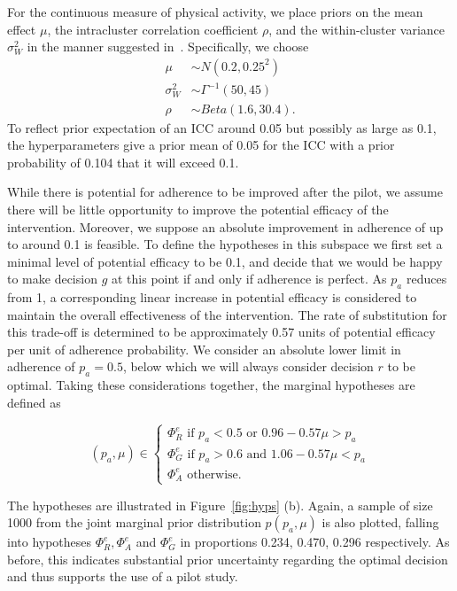 \documentclass[AMA,STIX1COL]{WileyNJD-v2}
\begin{document}
For the continuous measure of physical activity, we  place priors on the mean effect $\mu$, the intracluster correlation coefficient $\rho$, and the within-cluster variance $\sigma_{W}^{2}$ in the manner suggested in~\cite{Spiegelhalter2001}. Specifically, we choose
\begin{align}
\mu & \sim N(0.2, 0.25^{2}) \\
\sigma_{W}^{2} & \sim \Gamma^{-1}(50, 45) \\
\rho & \sim Beta(1.6, 30.4).
\end{align}
To reflect prior expectation of an ICC around 0.05 but possibly as large as 0.1, the hyperparameters give a prior mean of 0.05 for the ICC with a prior probability of 0.104 that it will exceed 0.1. 

While there is potential for adherence to be improved after the pilot, we assume there will be little opportunity to improve the potential efficacy of the intervention. Moreover, we suppose an absolute improvement in adherence of up to around 0.1 is feasible. To define the hypotheses in this subspace we first set a minimal level of potential efficacy to be 0.1, and decide that we would be happy to make decision $g$ at this point if and only if adherence is perfect. As $p_{a}$ reduces from 1, a corresponding linear increase in potential efficacy is considered to maintain the overall effectiveness of the intervention. The rate of substitution for this trade-off is determined to be approximately 0.57 units of potential efficacy per unit of adherence probability. We consider an absolute lower limit in adherence of $p_{a} = 0.5$, below which we will always consider decision $r$ to be optimal. Taking these considerations together, the marginal hypotheses are defined as

\begin{equation}
  (p_{a}, \mu) \in \begin{cases}
               \Phi^e_R \text{ if } p_{a} < 0.5 \text{ or } 0.96-0.57\mu > p_{a} \\
               \Phi^e_G \text{ if } p_{a} > 0.6 \text{ and } 1.06-0.57\mu < p_{a} \\
               \Phi^e_A \text{ otherwise.}
            \end{cases}
\end{equation}

The hypotheses are illustrated in Figure~\ref{fig:hyps} (b). Again, a sample of size 1000 from the joint marginal prior distribution $p(p_{a}, \mu)$ is also plotted, falling into hypotheses $\Phi^e_R, \Phi^e_A$ and $\Phi^e_G$ in proportions 0.234, 0.470, 0.296 respectively. As before, this indicates substantial prior uncertainty regarding the optimal decision and thus supports the use of a pilot study.
\end{document}
